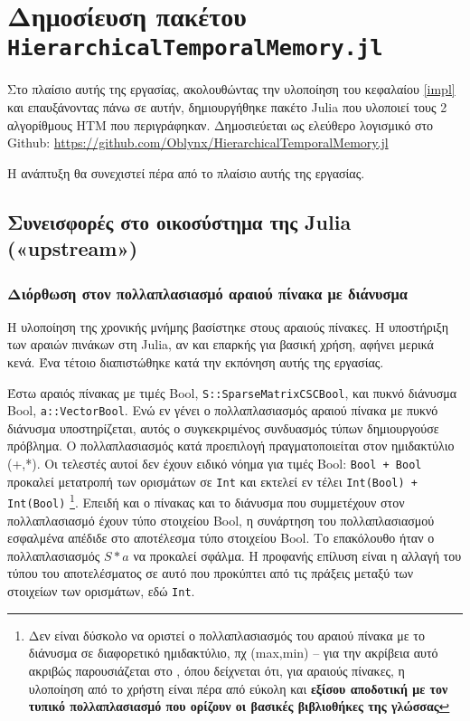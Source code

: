 \section{Δημοσίευση πακέτου \texttt{HierarchicalTemporalMemory.jl}}

	Στο πλαίσιο αυτής της εργασίας, ακολουθώντας την υλοποίηση του κεφαλαίου \ref{impl} και επαυξάνοντας πάνω σε αυτήν,
	δημιουργήθηκε πακέτο Julia που υλοποιεί τους 2 αλγορίθμους HTM που περιγράφηκαν.
	Δημοσιεύεται ως ελεύθερο λογισμικό \parencite{stallmanFreeSoftwareFree2002} στο Github:
	\url{https://github.com/Oblynx/HierarchicalTemporalMemory.jl}

	Η ανάπτυξη θα συνεχιστεί πέρα από το πλαίσιο αυτής της εργασίας.

\subsection{Συνεισφορές στο οικοσύστημα της Julia («upstream»)}

	\subsubsection{Διόρθωση στον πολλαπλασιασμό αραιού πίνακα με διάνυσμα}

	Η υλοποίηση της χρονικής μνήμης βασίστηκε στους αραιούς πίνακες.
	Η υποστήριξη των αραιών πινάκων στη Julia, αν και επαρκής για βασική χρήση, αφήνει μερικά κενά.
	Ένα τέτοιο διαπιστώθηκε κατά την εκπόνηση αυτής της εργασίας.

	Έστω αραιός πίνακας με τιμές Bool, \texttt{S::SparseMatrixCSC{Bool}},
	και πυκνό διάνυσμα Bool, \texttt{a::Vector{Bool}}.
	Ενώ εν γένει ο πολλαπλασιασμός αραιού πίνακα με πυκνό διάνυσμα υποστηρίζεται, αυτός ο συγκεκριμένος συνδυασμός τύπων δημιουργούσε πρόβλημα.
	Ο πολλαπλασιασμός κατά προεπιλογή πραγματοποιείται στον ημιδακτύλιο (+,*).
	Οι τελεστές αυτοί δεν έχουν ειδικό νόημα για τιμές Bool: \texttt{Bool + Bool} προκαλεί μετατροπή των ορισμάτων σε \texttt{Int} και εκτελεί εν τέλει \texttt{Int(Bool) + Int(Bool)}
	\footnote{ Δεν είναι δύσκολο να οριστεί ο πολλαπλασιασμός του αραιού πίνακα με το διάνυσμα σε διαφορετικό ημιδακτύλιο, πχ (max,min) --
	για την ακρίβεια αυτό ακριβώς παρουσιάζεται στο \cite{shahNovelAlgebrasAdvanced2013}, όπου δείχνεται ότι, για αραιούς πίνακες,
	η υλοποίηση από το χρήστη είναι πέρα από εύκολη και \textbf{εξίσου αποδοτική με τον τυπικό πολλαπλασιασμό που ορίζουν οι βασικές βιβλιοθήκες της γλώσσας} }.
	Επειδή και ο πίνακας και το διάνυσμα που συμμετέχουν στον πολλαπλασιασμό έχουν τύπο στοιχείου Bool,
	η συνάρτηση του πολλαπλασιασμού εσφαλμένα απέδιδε στο αποτέλεσμα τύπο στοιχείου Bool.
	Το επακόλουθο ήταν ο πολλαπλασιασμός $S*a$ να προκαλεί σφάλμα.
	Η προφανής επίλυση είναι η αλλαγή του τύπου του αποτελέσματος σε αυτό που προκύπτει από τις πράξεις μεταξύ των στοιχείων των ορισμάτων, εδώ \texttt{Int}.

